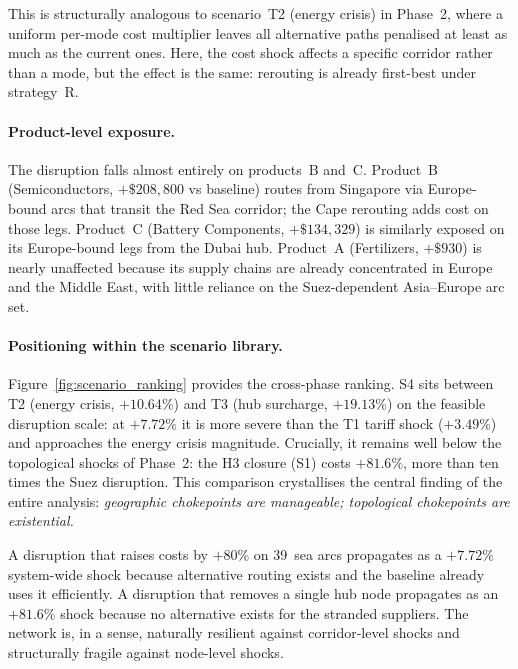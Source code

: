 This is structurally analogous to scenario~T2 (energy crisis) in
Phase~2, where a uniform per-mode cost multiplier leaves all
alternative paths penalised at least as much as the current ones.
Here, the cost shock affects a specific corridor rather than a
mode, but the effect is the same: rerouting is already
first-best under strategy~R.

\paragraph{Product-level exposure.}
The disruption falls almost entirely on products~B and~C. Product~B
(Semiconductors, $+\$208{,}800$ vs baseline) routes from Singapore via
Europe-bound arcs that transit the Red Sea corridor; the Cape rerouting
adds cost on those legs. Product~C (Battery Components, $+\$134{,}329$)
is similarly exposed on its Europe-bound legs from the Dubai hub.
Product~A (Fertilizers, $+\$930$) is nearly unaffected because its
supply chains are already concentrated in Europe and the Middle East,
with little reliance on the Suez-dependent Asia--Europe arc set.

\paragraph{Positioning within the scenario library.}
Figure~\ref{fig:scenario_ranking} provides the cross-phase ranking.
S4 sits between T2 (energy crisis, $+10.64\%$) and T3 (hub surcharge,
$+19.13\%$) on the feasible disruption scale: at $+7.72\%$ it is more
severe than the T1 tariff shock ($+3.49\%$) and approaches the energy
crisis magnitude. Crucially, it remains well below the topological
shocks of Phase~2: the H3 closure (S1) costs $+81.6\%$, more than
ten times the Suez disruption. This comparison crystallises the
central finding of the entire analysis: \emph{geographic chokepoints
are manageable; topological chokepoints are existential.}

A disruption that raises costs by $+80\%$ on 39~sea arcs propagates as
a $+7.72\%$ system-wide shock because alternative routing exists and
the baseline already uses it efficiently. A disruption that removes a
single hub node propagates as an $+81.6\%$ shock because no
alternative exists for the stranded suppliers. The network is,
in a sense, naturally resilient against corridor-level shocks and
structurally fragile against node-level shocks.


